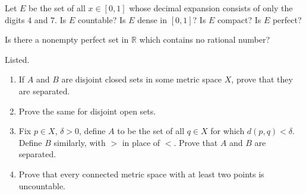 \documentclass{article}
\begin{document}
    \begin{exercise}[Rudin 2.17]
    Let $E$ be the set of all $x \in [0, 1]$ whose decimal expansion consists of only the digits $4$ and $7$. Is $E$ countable? Is $E$ dense in $[0, 1]$? Is $E$ compact? Is $E$ perfect? 
    \end{exercise}

    \begin{exercise}[Rudin 2.18]
    Is there a nonempty perfect set in $\mathbb{R}$ which contains no rational number? 
    \end{exercise}


    \begin{exercise}[Rudin 2.19]
    Listed. 
    \begin{enumerate}
        \item If $A$ and $B$ are disjoint closed sets in some metric space $X$, prove that they are separated. 
        \item Prove the same for disjoint open sets. 
        \item Fix $p \in X$, $\delta > 0$, define $A$ to be the set of all $q \in X$ for which $d(p, q) < \delta$. Define $B$ similarly, with $>$ in place of $<$. Prove that $A$ and $B$ are separated. 
        \item Prove that every connected metric space with at least two points is uncountable. 
    \end{enumerate}
    \end{exercise}
\end{document}

